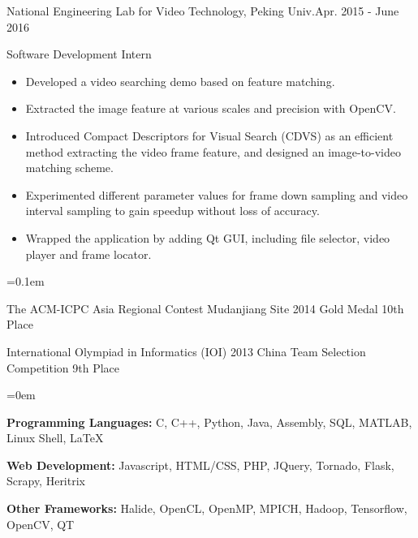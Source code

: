 \documentclass{joel_cv}
\begin{document}
	\begin{sectionContentSimple}{National Engineering Lab for Video Technology, Peking Univ.}{Apr. 2015 - June 2016}
		\item Software Development Intern
		\vspace{-0.5em}
		\begin{itemize}
			\itemsep=-0.6em
			\item Developed a video searching demo based on feature matching.
			\item Extracted the image feature at various scales and precision with OpenCV.
			\item Introduced Compact Descriptors for Visual Search (CDVS) as an efficient method extracting the video frame feature, and designed an image-to-video matching scheme.
			\item Experimented different parameter values for frame down sampling and video interval sampling to gain speedup without loss of accuracy.
			\item Wrapped the application by adding Qt GUI, including file selector, video player and frame locator.
		\end{itemize}
	\end{sectionContentSimple}
	
	
	\begin{description}{}
		\parskip=0.1em
		\item{\quad} The ACM-ICPC Asia Regional Contest Mudanjiang Site 2014 Gold Medal 10th Place
		\item{\quad} International Olympiad in Informatics (IOI) 2013 China Team Selection Competition 9th Place
	\end{description}
	
	
	\begin{description}{}
		\parskip=0em
		\item{\quad \textbf{Programming Languages:}}  C, C++, Python, Java, Assembly, SQL, MATLAB, Linux Shell, \LaTeX{}
		\item{\quad \textbf{Web Development:}} Javascript, HTML/CSS, PHP, JQuery, Tornado, Flask, Scrapy, Heritrix
		\item{\quad \textbf{Other Frameworks:}} Halide, OpenCL, OpenMP, MPICH, Hadoop, Tensorflow, OpenCV, QT
	\end{description}
	
	
	
\end{document}
